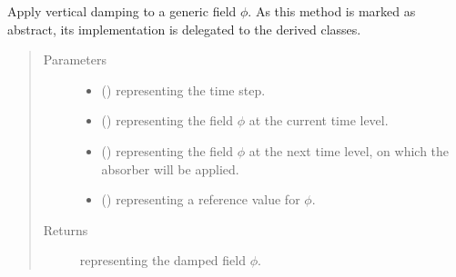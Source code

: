 \documentclass[letterpaper,10pt,english]{sphinxmanual}
\begin{document}
\begin{fulllineitems}
\begin{fulllineitems}
\end{fulllineitems}


\begin{fulllineitems}
\label{\detokenize{api:tasmania.dycore.vertical_damping.VerticalDamping.apply}}
Apply vertical damping to a generic field \(\phi\).
As this method is marked as abstract, its implementation is delegated to the derived classes.
\begin{quote}\begin{description}
\item[{Parameters}] \leavevmode\begin{itemize}
\item {} 
 () \textendash{}  representing the time step.

\item {} 
 () \textendash{}  representing the field \(\phi\) at the current time level.

\item {} 
 () \textendash{}  representing the field \(\phi\) at the next time level, on
which the absorber will be applied.

\item {} 
 () \textendash{}  representing a reference value for \(\phi\).

\end{itemize}

\item[{Returns}] \leavevmode
{} representing the damped field \(\phi\).


\end{description}
\end{quote}
\end{fulllineitems}
\end{fulllineitems}
\end{document}

